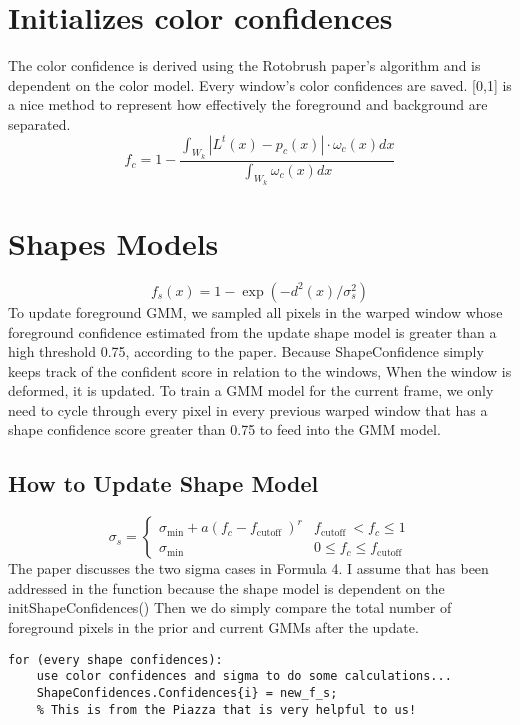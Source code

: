 \documentclass[15pt]{article}
\begin{document}
\section{Initializes color confidences}
The color confidence is derived using the Rotobrush paper's algorithm and is dependent on the color model. Every window's color confidences are saved. [0,1] is a nice method to represent how effectively the foreground and background are separated.
\begin{equation}
f_{c}=1-\frac{\int_{W_{k}}\left|L^{t}(x)-p_{c}(x)\right| \cdot \omega_{c}(x) d x}{\int_{W_{k}} \omega_{c}(x) d x}
\end{equation}

\section{Shapes Models}
\begin{equation}
f_{s}(x)=1-\exp \left(-d^{2}(x) / \sigma_{s}^{2}\right)
\end{equation}
To update foreground GMM, we sampled all pixels in the warped window whose foreground confidence estimated from the update shape model is greater than a high threshold 0.75, according to the paper. Because ShapeConfidence simply keeps track of the confident score in relation to the windows, When the window is deformed, it is updated. To train a GMM model for the current frame, we only need to cycle through every pixel in every previous warped window that has a shape confidence score greater than 0.75 to feed into the GMM model.

\subsection{How to Update Shape Model}
\begin{equation}
\sigma_{s}=\left\{\begin{array}{cl}
\sigma_{\min }+a\left(f_{c}-f_{\text {cutoff }}\right)^{r} & f_{\text {cutoff }}<f_{c} \leq 1 \\
\sigma_{\min } & 0 \leq f_{c} \leq f_{\text {cutoff }}
\end{array}\right.
\end{equation}
The paper discusses the two sigma cases in Formula 4. I assume that has been addressed in the function because the shape model is dependent on the initShapeConfidences() Then we do simply compare the total number of foreground pixels in the prior and current GMMs after the update.
\begin{lstlisting}
for (every shape confidences):
    use color confidences and sigma to do some calculations...
    ShapeConfidences.Confidences{i} = new_f_s;
    % This is from the Piazza that is very helpful to us!
\end{lstlisting}
\end{document}
